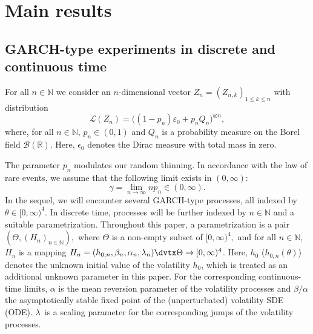 \documentclass[number,citesort,seceqn,dvips]{arxbj}
\newcommand{\RR}{\mathbb{R}}
\newcommand{\NN}{\mathbb{N}}
\newcommand{\BBB}{{\mathcal B}}
\newcommand{\LLL}{{\mathcal L}}
\begin{document}
\vspace*{2pt}\section{Main results}\label{mainresult}\vspace*{2pt}
\subsection{GARCH-type experiments in discrete and continuous time}\label{secGARCH}
 For all $n\in\NN$ we consider an $n$-dimensional
vector $Z_{n}=(Z_{n,k})_{1\le k\le n}$ with distribution
%
\begin{equation}\label{Znthinn}
\LLL(Z_n) =  \bigl((1 - p_n)\varepsilon_0+p_n Q_n \bigr)^{\otimes
n} ,
\end{equation}
%
where, for all $n\in\NN$, $p_n\in(0,1)$ and $Q_n$
is a probability measure on the Borel field $\BBB(\RR)$. Here,
$\epsilon_0$ denotes the Dirac measure with total mass in zero.

The parameter $p_n$ modulates our random thinning. In accordance with
the law of rare events, we assume that the following limit exists in
$(0,\infty)$:
%
\begin{equation}\label{lre}
\gamma = \lim_{n\to\infty}np_n\in (0,\infty) .
\end{equation}
%
In the sequel, we will encounter several GARCH-type processes, all
indexed by $\theta\in[0,\infty)^4$. In discrete time, processes will be
further indexed by $n\in\NN$ and a suitable parametrization. Throughout
this paper, a parametrization is a pair $(\Theta,(H_n)_{n\in\NN}),$
where $\Theta$ is a non-empty subset of $[0,\infty)^4,$ and for all
$n\in\NN$, $H_n$ is a mapping
$H_n=(h_{0,n},\beta_n,\alpha_n,\lambda_n)\dvtx\Theta\to[0,\infty)^4$. Here,
$h_0$ ($h_{0,n}(\theta)$) denotes the unknown initial value of the
volatility $h_0$, which is treated as an additional unknown parameter
in this paper. For the corresponding continuous-time limits, $\alpha$ is the mean
reversion parameter of the volatility processes and $\beta/\alpha$ the
asymptotically stable fixed point of the (unperturbated) volatility SDE
(ODE). $\lambda$~is a
scaling parameter for the corresponding jumps of the volatility
processes.
\end{document}
